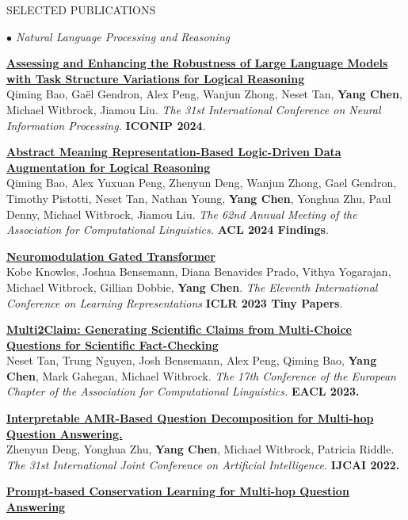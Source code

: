 \documentclass{resume} %
\begin{document}
\begin{rSection}{SELECTED PUBLICATIONS}
\begin{rSubsection}{\large\em $\bullet$ Natural Language Processing and Reasoning}{}{}{}
	\item {\href{https://arxiv.org/abs/2310.09430}{\bf Assessing and Enhancing the Robustness of Large Language Models with Task Structure Variations for Logical Reasoning}}\\ {Qiming Bao, Ga\"el Gendron, Alex Peng, Wanjun Zhong, Neset Tan, {\bf Yang Chen}, Michael Witbrock, Jiamou Liu.}
{\em The 31st International Conference on Neural Information Processing.} {\bf ICONIP 2024}.
	\item {\href{https://arxiv.org/abs/2305.12599}{\bf Abstract Meaning Representation-Based Logic-Driven Data Augmentation for Logical Reasoning}}\\ {Qiming Bao, Alex Yuxuan Peng, Zhenyun Deng, Wanjun Zhong, Gael Gendron, Timothy Pistotti, Neset Tan, Nathan Young, {\bf Yang Chen}, Yonghua Zhu, Paul Denny, Michael Witbrock, Jiamou Liu.}
{\em The 62nd Annual Meeting of the Association for Computational Linguistics.} {\bf ACL 2024 Findings}.
	\item {\href{https://arxiv.org/abs/2305.03232}{\bf Neuromodulation Gated Transformer}}\\
Kobe Knowles, Joshua Bensemann, Diana Benavides Prado, Vithya Yogarajan, Michael Witbrock, Gillian Dobbie, \textbf{Yang Chen}. {\em The Eleventh International Conference on Learning Representations} {\bf ICLR 2023 Tiny Papers}.\\
	\item {\href{https://aclanthology.org/2023.eacl-main.194.pdf}{\bf Multi2Claim: Generating Scientific Claims from Multi-Choice Questions for Scientific Fact-Checking}}\\
Neset Tan, Trung Nguyen, Josh Bensemann, Alex Peng, Qiming Bao, \textbf{Yang Chen}, Mark Gahegan, Michael Witbrock. {\em The 17th Conference of the European Chapter of the Association for Computational Linguistics.} {\bf EACL 2023.}\\
	\item {\href{https://www.ijcai.org/proceedings/2022/0568.pdf}{\bf Interpretable AMR-Based Question Decomposition for Multi-hop Question Answering.}}\\
		Zhenyun Deng, Yonghua Zhu, \textbf{Yang Chen}, Michael Witbrock, Patricia Riddle. {\em The 31st International Joint Conference on Artificial Intelligence.} \textbf{IJCAI 2022.}\\
	\item {\href{https://aclanthology.org/2022.coling-1.154.pdf}{\bf Prompt-based Conservation  Learning for Multi-hop Question Answering}}\\

\end{rSubsection}
\end{rSection}
\end{document}
